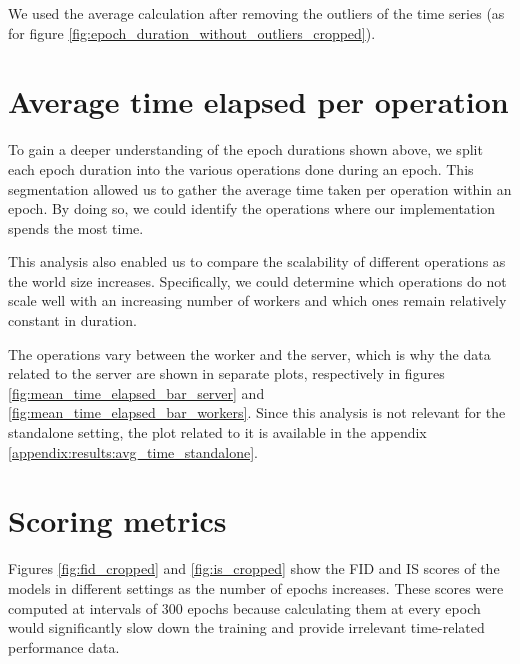 We used the average calculation after removing the outliers of the time series (as for figure \ref{fig:epoch_duration_without_outliers_cropped}).



\newpage
\section{Average time elapsed per operation}
To gain a deeper understanding of the epoch durations shown above, we split each epoch duration into the various operations done during an epoch. This segmentation allowed us to gather the average time taken per operation within an epoch. By doing so, we could identify the operations where our implementation spends the most time.

This analysis also enabled us to compare the scalability of different operations as the world size increases. Specifically, we could determine which operations do not scale well with an increasing number of workers and which ones remain relatively constant in duration.

The operations vary between the worker and the server, which is why the data related to the server are shown in separate plots, respectively in figures \ref{fig:mean_time_elapsed_bar_server} and \ref{fig:mean_time_elapsed_bar_workers}. Since this analysis is not relevant for the standalone setting, the plot related to it is available in the appendix \ref{appendix:results:avg_time_standalone}.


\newpage
\section{Scoring metrics}
Figures \ref{fig:fid_cropped} and \ref{fig:is_cropped} show the FID and IS scores of the models in different settings as the number of epochs increases. These scores were computed at intervals of 300 epochs because calculating them at every epoch would significantly slow down the training and provide irrelevant time-related performance data.


